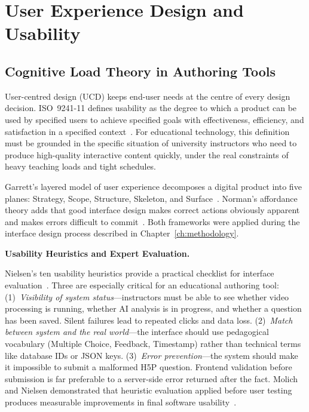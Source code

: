 \section{User Experience Design and Usability}

\subsection{Cognitive Load Theory in Authoring Tools}

User-centred design (UCD) keeps end-user needs at the centre of every design decision. ISO~9241-11 defines usability as the degree to which a product can be used by specified users to achieve specified goals with effectiveness, efficiency, and satisfaction in a specified context~\cite{iso9241}. For educational technology, this definition must be grounded in the specific situation of university instructors who need to produce high-quality interactive content quickly, under the real constraints of heavy teaching loads and tight schedules.

Garrett's layered model of user experience decomposes a digital product into five planes: Strategy, Scope, Structure, Skeleton, and Surface~\cite{garrett2010}. Norman's affordance theory adds that good interface design makes correct actions obviously apparent and makes errors difficult to commit~\cite{norman1988}. Both frameworks were applied during the interface design process described in Chapter~\ref{ch:methodology}.

\textbf{Usability Heuristics and Expert Evaluation.}

Nielsen's ten usability heuristics provide a practical checklist for interface evaluation~\cite{nielsen1994}. Three are especially critical for an educational authoring tool:
(1)~\emph{Visibility of system status}---instructors must be able to see whether video processing is running, whether AI analysis is in progress, and whether a question has been saved. Silent failures lead to repeated clicks and data loss.
(2)~\emph{Match between system and the real world}---the interface should use pedagogical vocabulary (Multiple Choice, Feedback, Timestamp) rather than technical terms like database IDs or JSON keys.
(3)~\emph{Error prevention}---the system should make it impossible to submit a malformed H5P question. Frontend validation before submission is far preferable to a server-side error returned after the fact. Molich and Nielsen demonstrated that heuristic evaluation applied before user testing produces measurable improvements in final software usability~\cite{molich1990}.

